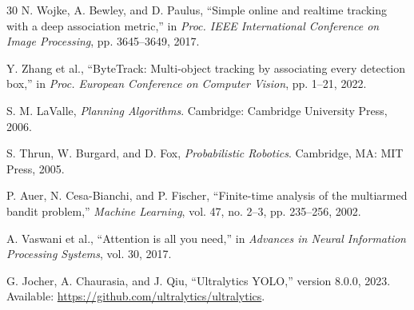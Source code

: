 \documentclass[runningheads]{llncs}
\begin{document}
\begin{thebibliography}{30}
N. Wojke, A. Bewley, and D. Paulus, ``Simple online and realtime tracking with a deep association metric,'' in \textit{Proc. IEEE International Conference on Image Processing}, pp. 3645--3649, 2017.

Y. Zhang et al., ``ByteTrack: Multi-object tracking by associating every detection box,'' in \textit{Proc. European Conference on Computer Vision}, pp. 1--21, 2022.

S. M. LaValle, \textit{Planning Algorithms}. Cambridge: Cambridge University Press, 2006.

S. Thrun, W. Burgard, and D. Fox, \textit{Probabilistic Robotics}. Cambridge, MA: MIT Press, 2005.

P. Auer, N. Cesa-Bianchi, and P. Fischer, ``Finite-time analysis of the multiarmed bandit problem,'' \textit{Machine Learning}, vol. 47, no. 2--3, pp. 235--256, 2002.

A. Vaswani et al., ``Attention is all you need,'' in \textit{Advances in Neural Information Processing Systems}, vol. 30, 2017.

G. Jocher, A. Chaurasia, and J. Qiu, ``Ultralytics YOLO,'' version 8.0.0, 2023. Available: \url{https://github.com/ultralytics/ultralytics}.

\end{thebibliography}
\end{document}
